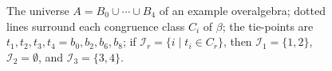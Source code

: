 \documentclass{au}
\numberwithin{equation}{section}
\theoremstyle{plain}
\theoremstyle{definition}
\newcommand{\<}{\ensuremath{\langle}}
\renewcommand{\>}{\ensuremath{\rangle}}
\newcommand{\sI}{\ensuremath{\mathcal{I}}}
\begin{document}
\begin{figure}
{
      }
      \caption{The universe $A = B_0 \cup \cdots \cup B_4$ of an
       example overalgebra; dotted lines surround each congruence class $C_i$ of
       $\beta$; the tie-points are $t_1, t_2, t_3, t_4 = b_0, b_2, b_6, b_8$;
       if %
       $\sI_r = \{i \mid t_i \in C_r\}$, then
      $\sI_1 = \{1, 2\}$, $\sI_2 = \emptyset$, and $\sI_3 = \{3, 4\}$.
}
      \label{fig:overalgebra}
\end{figure}
\end{document}
